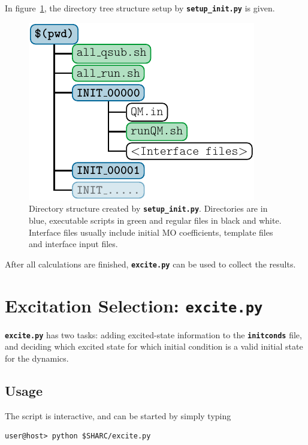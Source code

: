 \documentclass[a4paper,10pt,DIV=15,openany,twoside=false]{scrbook}
\newcommand{\ttt}[1]{\textbf{\texttt{#1}}}
\begin{document}
In figure~\ref{fig:dirs_init}, the directory tree structure setup by \ttt{setup\_init.py} is given.

\begin{figure}
  \centering
  \includegraphics[scale=1]{img/dirs_init/dirs_init.pdf}
  \caption{Directory structure created by \ttt{setup\_init.py}. Directories are in blue, executable scripts in green and regular files in black and white. Interface files usually include initial MO coefficients, template files and interface input files.}
  \label{fig:dirs_init}
\end{figure}

After all calculations are finished, \ttt{excite.py} can be used to collect the results.





\section{Excitation Selection: \ttt{excite.py}}\label{sec:excite.py}

\ttt{excite.py} has two tasks: adding excited-state information to the \ttt{initconds} file, and deciding which excited state for which initial condition is a valid initial state for the dynamics.


\subsection{Usage}

The script is interactive, and can be started by simply typing 
\begin{verbatim}
user@host> python $SHARC/excite.py
\end{verbatim}
\end{document}
